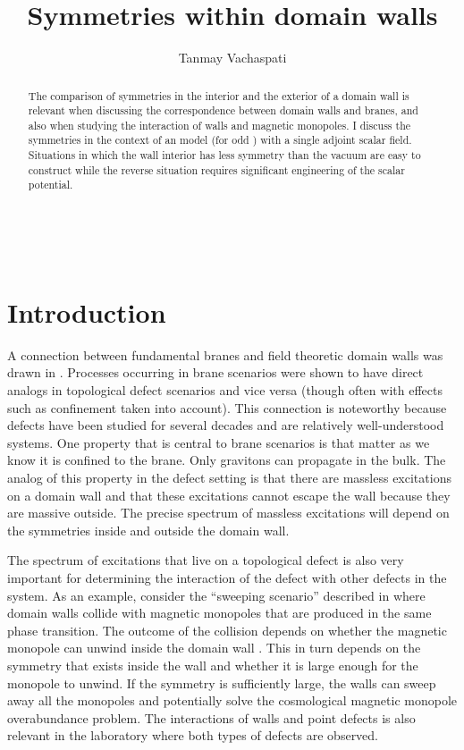 \documentclass[a4paper,prd,nofootinbib,twocolumn,showpacs]{revtex4}
\begin{document}
\title{
Symmetries within domain walls
}

\author{Tanmay Vachaspati}

\begin{abstract}
The comparison of symmetries in the interior and the exterior 
of a domain wall is relevant when discussing the correspondence
between domain walls and branes, and also when studying the 
interaction of walls and magnetic monopoles. I discuss the symmetries
in the context of an \coordHE{} model (for odd \coordHE{}) with a 
single adjoint scalar field. Situations in which the wall interior 
has less symmetry than the vacuum are easy to construct while the 
reverse situation requires significant engineering of the scalar 
potential. 
\end{abstract}


\

\maketitle

\section{Introduction}

A connection between fundamental branes and field theoretic domain 
walls was drawn in \cite{DvaShi97,DvaVil02}. Processes occurring
in brane scenarios were shown to have direct analogs in 
topological defect scenarios and vice versa (though often
with effects such as confinement taken into account). This 
connection is noteworthy because defects have been studied for 
several decades and are relatively well-understood systems. 
One property that is central to brane scenarios is that matter
as we know it is confined to the brane. Only gravitons can 
propagate in the bulk. The analog of this property in the defect 
setting is that there are massless excitations on a domain wall
and that these excitations cannot escape the wall because they
are massive outside. The precise spectrum of massless excitations
will depend on the symmetries inside and outside the domain wall.

The spectrum of excitations that live on a topological defect is 
also very important for determining the interaction of the defect
with other defects in the system. As an example, consider the
``sweeping scenario'' described in \cite{DvaLiuVac97} where
domain walls collide with magnetic monopoles that are produced
in the same phase transition. The outcome of the collision
depends on whether the magnetic monopole can unwind inside 
the domain wall \cite{PogVac00a,PogVac00b}. This in turn depends
on the symmetry that exists inside the wall and whether it is
large enough for the monopole to unwind. If the symmetry is
sufficiently large, the walls can sweep away all the monopoles
and potentially solve the cosmological magnetic monopole 
overabundance problem. The interactions of walls and point 
defects is also relevant in the laboratory where both types 
of defects are observed.
\end{document}
